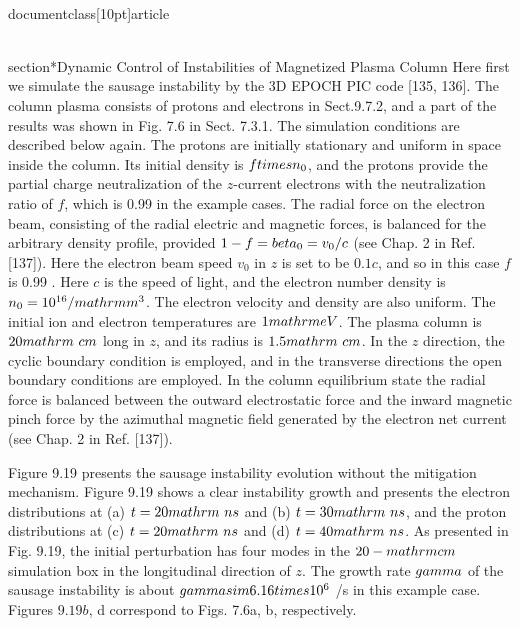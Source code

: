 \\documentclass[10pt]{article}
\begin{document}
{{{{{{\\section*{Dynamic Control of Instabilities of Magnetized Plasma Column}
Here first we simulate the sausage instability by the 3D EPOCH PIC code [135, 136]. The column plasma consists of protons and electrons in Sect.9.7.2, and a part of the results was shown in Fig. 7.6 in Sect. 7.3.1. The simulation conditions are described below again. The protons are initially stationary and uniform in space inside the column. Its initial density is $f \\times n_{0}$, and the protons provide the partial charge neutralization of the $z$-current electrons with the neutralization ratio of $f$, which is 0.99 in the example cases. The radial force on the electron beam, consisting of
the radial electric and magnetic forces, is balanced for the arbitrary density profile, provided $1-f=\\beta_{0}=v_{0} / c$ (see Chap. 2 in Ref. [137]). Here the electron beam speed $v_{0}$ in $z$ is set to be $0.1 c$, and so in this case $f$ is 0.99 . Here $c$ is the speed of light, and the electron number density is $n_{0}=10^{16} / \\mathrm{m}^{3}$. The electron velocity and density are also uniform. The initial ion and electron temperatures are $1 \\mathrm{eV}$. The plasma column is $20 \\mathrm{~cm}$ long in $z$, and its radius is $1.5 \\mathrm{~cm}$. In the $z$ direction, the cyclic boundary condition is employed, and in the transverse directions the open boundary conditions are employed. In the column equilibrium state the radial force is balanced between the outward electrostatic force and the inward magnetic pinch force by the azimuthal magnetic field generated by the electron net current (see Chap. 2 in Ref. [137]).

Figure 9.19 presents the sausage instability evolution without the mitigation mechanism. Figure 9.19 shows a clear instability growth and presents the electron distributions at (a) $t=20 \\mathrm{~ns}$ and (b) $t=30 \\mathrm{~ns}$, and the proton distributions at (c) $t=20 \\mathrm{~ns}$ and (d) $t=40 \\mathrm{~ns}$. As presented in Fig. 9.19, the initial perturbation has four modes in the $20-\\mathrm{cm}$ simulation box in the longitudinal direction of $z$. The growth rate $\\gamma$ of the sausage instability is about $\\gamma \\sim 6.16 \\times 10^{6}$ /s in this example case. Figures $9.19 b$, d correspond to Figs. 7.6a, b, respectively.

}}}}}}
\end{document}
